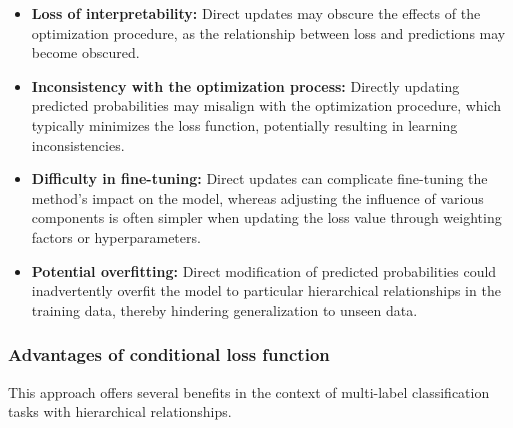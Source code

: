 \begin{itemize}
    \item \textbf{Loss of interpretability:} Direct updates may obscure the effects of the optimization procedure, as the relationship between loss and predictions may become obscured.

    \item \textbf{Inconsistency with the optimization process: }Directly updating predicted probabilities may misalign with the optimization procedure, which typically minimizes the loss function, potentially resulting in learning inconsistencies.

    \item \textbf{Difficulty in fine-tuning:} Direct updates can complicate fine-tuning the method's impact on the model, whereas adjusting the influence of various components is often simpler when updating the loss value through weighting factors or hyperparameters.

    \item \textbf{Potential overfitting:} Direct modification of predicted probabilities could inadvertently overfit the model to particular hierarchical relationships in the training data, thereby hindering generalization to unseen data.
\end{itemize}

\subsubsection{Advantages of conditional loss function}

This approach offers several benefits in the context of multi-label classification tasks with hierarchical relationships.

